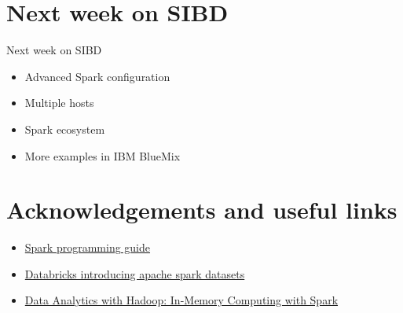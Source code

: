 \documentclass{beamer}
\begin{document}
\section*{Next week on SIBD}

\begin{frame}{Next week on SIBD}
  \begin{itemize}
  \item Advanced Spark configuration
  \item Multiple hosts
  \item Spark ecosystem
  \item More examples in IBM BlueMix
  \end{itemize}
\end{frame}

\section{Acknowledgements and useful links}

\begin{frame}
  \begin{itemize}
\item \href{http://spark.apache.org/docs/latest/programming-guide.html}{Spark programming guide}
\item \href{https://databricks.com/blog/2016/01/04/introducing-apache-spark-datasets.html}{Databricks introducing apache spark datasets}
\item \href{https://www.safaribooksonline.com/library/view/data-analytics-with/9781491913734/ch04.html}{Data Analytics with Hadoop: In-Memory Computing with Spark}
  \end{itemize}
\end{frame}
\end{document}
